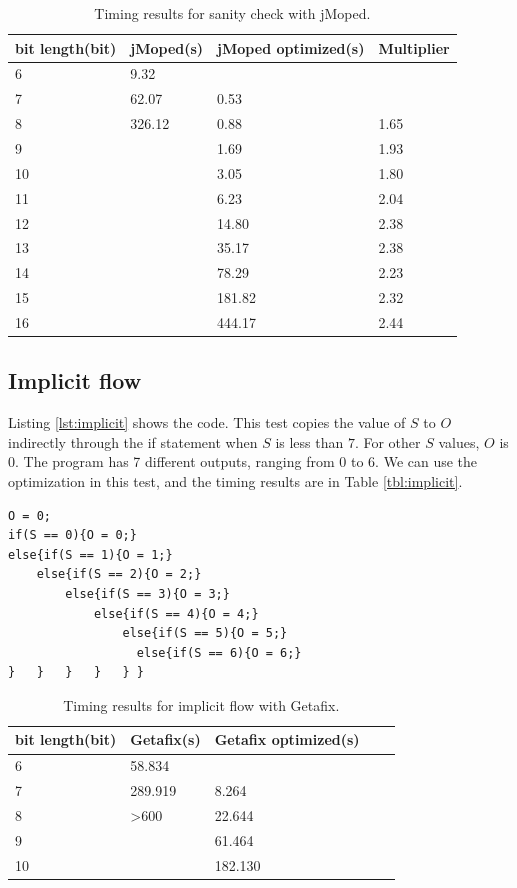 \begin{table}[!h]
\centering
\begin{tabular}{|l|l|l|l|}
\hline
bit length(bit) & jMoped(s) & jMoped optimized(s) & Multiplier \\ \hline
6 & 9.32 &  &  \\ \hline
7 & 62.07 & 0.53 &  \\ \hline
8 & 326.12 & 0.88 & 1.65 \\ \hline
9 &  & 1.69 & 1.93 \\ \hline
10 &  & 3.05 & 1.80 \\ \hline
11 &  & 6.23 & 2.04 \\ \hline
12 &  & 14.80 & 2.38 \\ \hline
13 &  & 35.17 & 2.38 \\ \hline
14 &  & 78.29 & 2.23 \\ \hline
15 &  & 181.82 & 2.32 \\ \hline
16 &  & 444.17 & 2.44 \\ \hline
\end{tabular}
\caption{Timing results for sanity check with jMoped.}
\label{tbl:sanityJ}
\end{table}

\subsection{Implicit flow}
Listing \ref{lst:implicit} shows the code. This test copies the value of $S$ to $O$ indirectly through the if statement when $S$ is less than $7$. For other $S$ values, $O$ is $0$. The program has 7 different outputs, ranging from $0$ to $6$. We can use the optimization in this test, and the timing results are in Table \ref{tbl:implicit}.

\lstset{language=C}  
\begin{lstlisting}[float=!h, caption={Implict flow test program.},label=lst:implicit]
O = 0;
if(S == 0){O = 0;}
else{if(S == 1){O = 1;}
	else{if(S == 2){O = 2;}
		else{if(S == 3){O = 3;}
			else{if(S == 4){O = 4;}
				else{if(S == 5){O = 5;}
				  else{if(S == 6){O = 6;}
}	}	}	} 	} }
\end{lstlisting}

\begin{table}[!h]
\centering
\begin{tabular}{|l|l|l|l|l|}
\hline
{bit length(bit)} & Getafix(s) & {Getafix optimized(s)}  \\ \hline
6 & {58.834} & {}  \\ \hline
7 & {289.919} & 8.264  \\ \hline
8 & \textgreater 600 & 22.644  \\ \hline
9 &  & 61.464  \\ \hline
10 &  & 182.130 \\ \hline
\end{tabular}
\caption{Timing results for implicit flow with Getafix.}
\label{tbl:implicitG}
\end{table}

